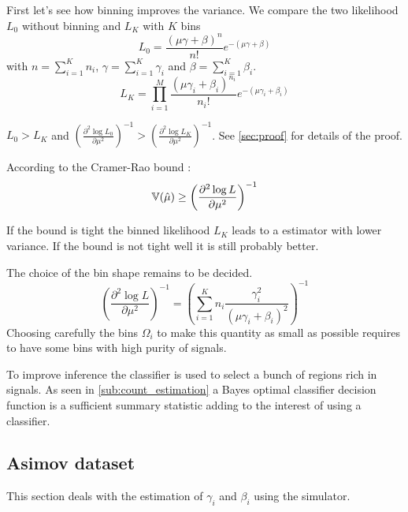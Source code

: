 First let's see how binning improves the variance.
We compare the two likelihood $L_0$ without binning and $L_K$ with $K$ bins
\begin{equation}
    L_0 = \frac{(\mu \gamma + \beta)^n }{n!} e^{-(\mu \gamma + \beta)}
\end{equation}
with $n = \sum_{i=1}^K n_i $, $\gamma = \sum_{i=1}^K \gamma_i $ and $\beta = \sum_{i=1}^K \beta_i $.
\begin{equation}
    L_K = \prod_{i=1}^M \frac{(\mu \gamma_i + \beta_i)^{n_i} }{n_i!} e^{-(\mu \gamma_i + \beta_i)}
\end{equation}

$L_0 > L_K$ and 
$\left (\frac{\partial^2 \log L_0}{\partial \mu^2}\right )^{-1} > \left (\frac{\partial^2 \log L_K}{\partial \mu^2}\right )^{-1}$.
See \autoref{sec:proof} for details of the proof.

According to the Cramer-Rao bound :
\begin{equation}
    \mathbb{V}(\hat\mu) \geq \left (\frac{\partial^2 \log L}{\partial \mu^2}\right )^{-1}
\end{equation}

If the bound is tight the binned likelihood $L_K$ leads to a estimator with lower variance.
If the bound is not tight well it is still probably better.

The choice of the bin shape remains to be decided.
\begin{equation}
    \left (\frac{\partial^2 \log L}{\partial \mu^2}\right )^{-1} = \left ( \sum_{i=1}^K n_i \frac{\gamma_i^2}{(\mu \gamma_i + \beta_i)^2} \right )^{-1}
\end{equation}
Choosing carefully the bins $\Omega_i$ to make this quantity as small as possible requires to have some bins with high purity of signals.

To improve inference the classifier is used to select a bunch of regions rich in signals.
As seen in \autoref{sub:count_estimation} a Bayes optimal classifier decision function is a sufficient summary statistic adding to the interest of using a classifier.






\subsection{Asimov dataset} %
\label{sub:asimov_dataset}

This section deals with the estimation of $\gamma_i$ and $\beta_i$ using the simulator.

